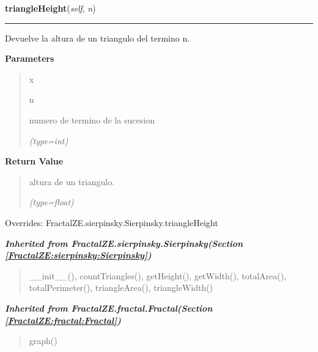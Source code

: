\hspace{.8\funcindent}\begin{boxedminipage}{\funcwidth}

    \raggedright \textbf{triangleHeight}(\textit{self}, \textit{n})

    \vspace{-1.5ex}

    \rule{\textwidth}{0.5\fboxrule}
\setlength{\parskip}{2ex}
    Devuelve la altura de un triangulo del termino n.

\setlength{\parskip}{1ex}
      \textbf{Parameters}
      \vspace{-1ex}

      \begin{quote}
        \begin{Ventry}{x}

          \item[n]

          numero de termino de la sucesion

            {\it (type=int)}

        \end{Ventry}

      \end{quote}

      \textbf{Return Value}
    \vspace{-1ex}

      \begin{quote}
      altura de un triangulo.

      {\it (type=float)}

      \end{quote}

      Overrides: FractalZE.sierpinsky.Sierpinsky.triangleHeight

    \end{boxedminipage}


\large{\textbf{\textit{Inherited from FractalZE.sierpinsky.Sierpinsky\textit{(Section \ref{FractalZE:sierpinsky:Sierpinsky})}}}}

\begin{quote}
\_\_init\_\_(), countTriangles(), getHeight(), getWidth(), totalArea(), totalPerimeter(), triangleArea(), triangleWidth()
\end{quote}

\large{\textbf{\textit{Inherited from FractalZE.fractal.Fractal\textit{(Section \ref{FractalZE:fractal:Fractal})}}}}

\begin{quote}
graph()
\end{quote}
